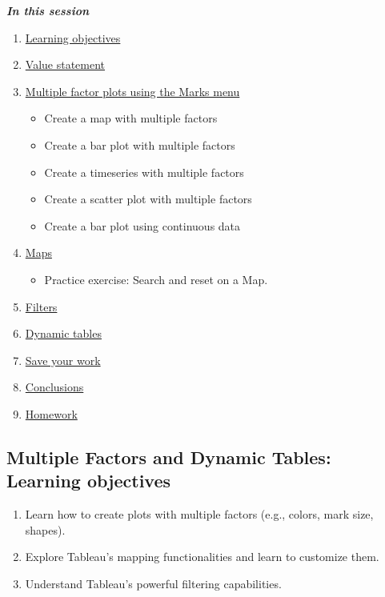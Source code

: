 \documentclass[
]{book}
\providecommand{\tightlist}{%
  \setlength{\itemsep}{0pt}\setlength{\parskip}{0pt}}
\begin{document}
\textbf{\emph{In this session }}

\begin{enumerate}
\def\labelenumi{\arabic{enumi}.}
\tightlist
\item
  \protect\hyperlink{multiple-factors-and-dynamic-tables-learning-objectives}{Learning objectives}
\item
  \protect\hyperlink{multiple-factors-and-dynamic-tables-value-statement}{Value statement}
\item
  \protect\hyperlink{multiple-factor-plots-using-the-marks-menu}{Multiple factor plots using the Marks menu}

  \begin{itemize}
  \tightlist
  \item
    Create a map with multiple factors
  \item
    Create a bar plot with multiple factors
  \item
    Create a timeseries with multiple factors
  \item
    Create a scatter plot with multiple factors
  \item
    Create a bar plot using continuous data
  \end{itemize}
\item
  \protect\hyperlink{maps}{Maps}

  \begin{itemize}
  \tightlist
  \item
    Practice exercise: Search and reset on a Map.
  \end{itemize}
\item
  \protect\hyperlink{filters}{Filters}
\item
  \protect\hyperlink{dynamic-tables}{Dynamic tables}
\item
  \protect\hyperlink{save-your-work}{Save your work}
\item
  \protect\hyperlink{conclusions}{Conclusions}
\item
  \protect\hyperlink{homework}{Homework}
\end{enumerate}

\hypertarget{multiple-factors-and-dynamic-tables-learning-objectives}{%
\subsection{Multiple Factors and Dynamic Tables: Learning objectives}\label{multiple-factors-and-dynamic-tables-learning-objectives}}

\begin{enumerate}
\def\labelenumi{\arabic{enumi}.}
\tightlist
\item
  Learn how to create plots with multiple factors (e.g., colors, mark size, shapes).
\item
  Explore Tableau's mapping functionalities and learn to customize them.
\item
  Understand Tableau's powerful filtering capabilities.
\end{enumerate}
\end{document}
